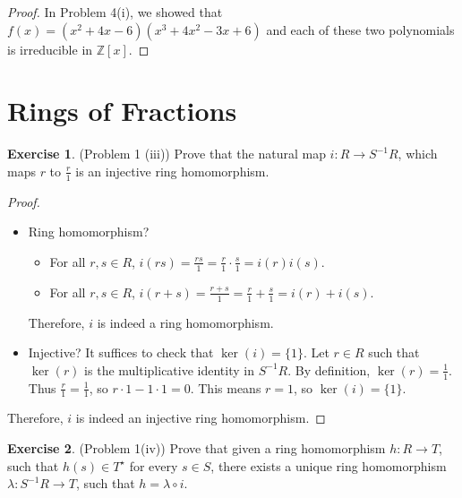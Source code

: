 \documentclass[12pt, psamsfonts]{amsart}
\theoremstyle{definition}
\newtheorem*{exer}{Exercise}
\theoremstyle{remark}
\numberwithin{equation}{section}
\begin{document}
\begin{proof}
  In Problem 4(i), we showed that $f(x) = (x^2 + 4x - 6)(x^3 + 4x^2 - 3x + 6)$ and each of these two polynomials is irreducible in $\mathbb{Z}[x]$.
\end{proof}

\section{Rings of Fractions}
\begin{exer}{(Problem 1 (iii))}
  Prove that the natural map $i: R \rightarrow S^{-1}R$, which maps $r$ to $\frac{r}{1}$ is an injective ring homomorphism.
\end{exer}

\begin{proof}
  $ $
  \begin{itemize}
    \item
      Ring homomorphism?
      \begin{itemize}
        \item
          For all $r, s \in R$, $i(rs) = \frac{rs}{1} = \frac{r}{1} \cdot \frac{s}{1} = i(r)i(s)$.
        \item
          For all $r, s \in R$, $i(r + s) = \frac{r + s}{1} = \frac{r}{1} + \frac{s}{1} = i(r) + i(s)$.
      \end{itemize}
      Therefore, $i$ is indeed a ring homomorphism.
    \item
      Injective?
      It suffices to check that $\ker(i) = \{ 1 \}$.
      Let $r \in R$ such that $\ker(r)$ is the multiplicative identity in $S^{-1}R$.
      By definition, $\ker(r) = \frac{1}{1}$.
      Thus $\frac{r}{1} = \frac{1}{1}$, so $r \cdot 1 - 1 \cdot 1 = 0$.
      This means $r = 1$, so $\ker(i) = \{ 1 \}$.
  \end{itemize}
  Therefore, $i$ is indeed an injective ring homomorphism.
\end{proof}

\begin{exer}{(Problem 1(iv))}
  Prove that given a ring homomorphism $h: R \rightarrow T$, such that $h(s) \in T^{\star}$ for every $s \in S$, there exists a unique ring homomorphism $\lambda: S^{-1}R \rightarrow T$, such that $h = \lambda \circ i$.
\end{exer}
\end{document}
